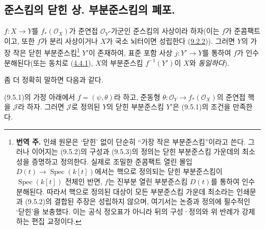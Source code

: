 \subsection{준스킴의 닫힌 상. 부분준스킴의 폐포.}
\label{subsection:I.9.5-ko}

\begin{proposition}[9.5.1]
\label{I.9.5.1-ko}
$f:X\to Y$를 $f_*(\mathscr{O}_X)$가 준연접
$\mathscr{O}_Y$-가군인 준스킴의 사상이라 하자(이는 $f$가 준콤팩트이고,
또한 $f$가 분리 사상이거나 $X$가 국소 뇌터이면 성립한다
(\hyperref[I.9.2.2-ko]{9.2.2})). 그러면 $Y$의 가장 작은
닫힌 부분준스킴\footnote{\textbf{번역 주.} 인쇄 원문은 ‘닫힌’ 없이
단순히 “가장 작은 부분준스킴”이라고 쓴다.
그러나 이어지는 (9.5.2)의 구성과 (9.5.3)의 정의는 닫힌
부분준스킴 가운데의 최소성을 증명하고 정의한다. 실제로 조밀한
준콤팩트 열린 몰입 $D(t)\to\operatorname{Spec}(k[t])$에서는 핵으로
정의되는 닫힌 부분준스킴이 $\operatorname{Spec}(k[t])$ 전체인 반면,
$f$는 진부분 열린 부분준스킴 $D(t)$를 통하여 인수분해된다. 따라서
핵으로 정의된 대상이 모든 부분준스킴 가운데 최소라는 인쇄문과
(9.5.2)의 결합된 주장은 성립하지 않으며, 여기서는 논증과 정의에
필수적인 ‘닫힌’을 보충했다. 이는 공식 정오표가 아니라 뒤의
구성·정의와 위 반례가 강제하는 편집 교정이다.}
$Y'$이 존재하여, 표준 포함 사상 $j:Y'\to Y$를 통하여 $f$가
인수분해된다(또는 동치로
(\hyperref[I.4.4.1-ko]{4.4.1}), $X$의 부분준스킴
$f^{-1}(Y')$이 $X$와 \emph{동일하다}).
\end{proposition}

좀 더 정확히 말하면 다음과 같다.

\begin{corollary}[9.5.2]
\label{I.9.5.2-ko}
(9.5.1)의 가정 아래에서 $f=(\psi,\theta)$라 하고, 준동형
$\theta:\mathscr{O}_Y\to f_*(\mathscr{O}_X)$의 준연접 핵을
$\mathscr{J}$라 하자. 그러면 $\mathscr{J}$로 정의된 $Y$의 닫힌
부분준스킴 $Y'$은 (9.5.1)의 조건을 만족한다.
\end{corollary}

